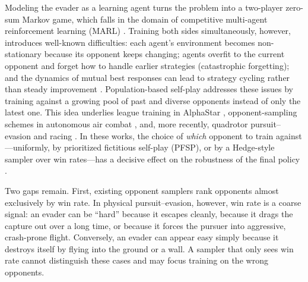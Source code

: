 Modeling the evader as a learning agent turns the problem into a two-player zero-sum Markov game, which falls in the domain of competitive multi-agent reinforcement learning (MARL) \cite{zhangMultiAgentReinforcementLearning2021, liangReviewMultiAgentReinforcement2025, loweMultiAgentActorCriticMixed2017}. Training both sides simultaneously, however, introduces well-known difficulties: each agent's environment becomes non-stationary because its opponent keeps changing; agents overfit to the current opponent and forget how to handle earlier strategies (catastrophic forgetting); and the dynamics of mutual best responses can lead to strategy cycling rather than steady improvement \cite{liFightLadderBenchmarkCompetitive2024, ronceroLearnedControllersAgile2026}. Population-based self-play addresses these issues by training against a growing pool of past and diverse opponents instead of only the latest one. This idea underlies league training in AlphaStar \cite{vinyalsGrandmasterLevelStarCraft2019}, opponent-sampling schemes in autonomous air combat \cite{chenAutonomousDogfightDecisionMaking2025}, and, more recently, quadrotor pursuit--evasion and racing \cite{xiaoLearningMultipursuitEvasion2024, ronceroLearnedControllersAgile2026, tangAgilePEAutonomousUAV2026a, gavinAgileInterceptionFlying2026, gavinInterceptingAgileTarget2026, gelesSuperhumanSafeAgile2026}. In these works, the choice of \emph{which} opponent to train against---uniformly, by prioritized fictitious self-play (PFSP), or by a Hedge-style sampler over win rates---has a decisive effect on the robustness of the final policy \cite{chenAutonomousDogfightDecisionMaking2025, ronceroLearnedControllersAgile2026, gavinInterceptingAgileTarget2026}.

Two gaps remain. First, existing opponent samplers rank opponents almost exclusively by win rate. In physical pursuit--evasion, however, win rate is a coarse signal: an evader can be ``hard'' because it escapes cleanly, because it drags the capture out over a long time, or because it forces the pursuer into aggressive, crash-prone flight. Conversely, an evader can appear easy simply because it destroys itself by flying into the ground or a wall. A sampler that only sees win rate cannot distinguish these cases and may focus training on the wrong opponents.

